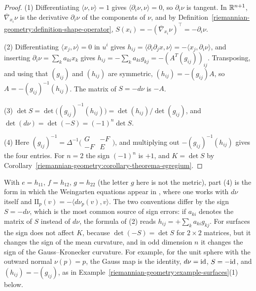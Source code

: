 \begin{proof}
(1) Differentiating $\langle\nu, \nu\rangle = 1$ gives $\langle\partial_i\nu, \nu\rangle = 0$, so $\partial_i\nu$ is tangent. In $\mathbb{R}^{n+1}$, $\overline{\nabla}_{x_i}\nu$ is the
derivative $\partial_i\nu$ of the components of $\nu$, and by Definition~\ref{riemannian-geometry:definition-shape-operator},
$S(x_i) = -(\overline{\nabla}_{x_i}\nu)^\top = -\partial_i\nu$.

(2) Differentiating $\langle x_j, \nu\rangle = 0$ in $u^i$ gives $h_{ij} = \langle\partial_i\partial_jx, \nu\rangle = -\langle x_j, \partial_i\nu\rangle$, and inserting
$\partial_i\nu = \sum_ka_{ki}x_k$ gives $h_{ij} = -\sum_ka_{ki}g_{kj} = -(A^T(g_{ij}))_{ij}$. Transposing, and using that $(g_{ij})$ and $(h_{ij})$ are symmetric,
$(h_{ij}) = -(g_{ij})A$, so $A = -(g_{ij})^{-1}(h_{ij})$. The matrix of $S = -d\nu$ is $-A$.

(3) $\det S = \det\bigl((g_{ij})^{-1}(h_{ij})\bigr) = \det(h_{ij})/\det(g_{ij})$, and $\det(d\nu) = \det(-S) = (-1)^n\det S$.

(4) Here $(g_{ij})^{-1} = \Delta^{-1}\bigl(\begin{smallmatrix} G & -F\\ -F & E\end{smallmatrix}\bigr)$, and multiplying out $-(g_{ij})^{-1}(h_{ij})$ gives the four entries.
For $n = 2$ the sign $(-1)^n$ is $+1$, and $K = \det S$ by Corollary~\ref{riemannian-geometry:corollary-theorema-egregium}.
\end{proof}

\begin{remark}\label{riemannian-geometry:remark-sign-conventions}
With $e = h_{11}$, $f = h_{12}$, $g = h_{22}$ (the letter $g$ here is not the metric), part (4) is the form in which the Weingarten equations appear in
\cite[Chapter 3]{do-carmo-curves-surfaces}, where one works with $d\nu$ itself and $\mathrm{II}_p(v) = -\langle d\nu_p(v), v\rangle$. The two conventions differ by the
sign $S = -d\nu$, which is the most common source of sign errors: if $a_{ki}$ denotes the matrix of $S$ instead of $d\nu$, the formula of (2) reads
$h_{ij} = +\sum_ka_{ki}g_{kj}$. For surfaces the sign does not affect $K$, because $\det(-S) = \det S$ for $2 \times 2$ matrices, but it changes the sign of the mean
curvature, and in odd dimension $n$ it changes the sign of the Gauss--Kronecker curvature. For example, for the unit sphere with the outward normal $\nu(p) = p$, the Gauss map
is the identity, $d\nu = \mathrm{id}$, $S = -\mathrm{id}$, and $(h_{ij}) = -(g_{ij})$, as in Example~\ref{riemannian-geometry:example-surfaces}(1) below.
\end{remark}

